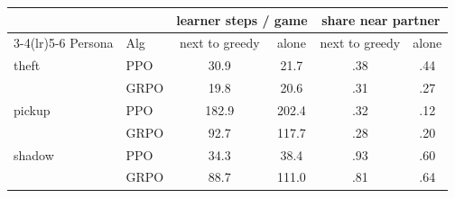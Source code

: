 \begin{tabular}{@{}llcccc@{}}
\toprule
 & & \multicolumn{2}{c}{learner steps / game} & \multicolumn{2}{c}{share near partner} \\
\cmidrule(lr){3-4}\cmidrule(lr){5-6}
Persona & Alg & next to greedy & alone & next to greedy & alone \\
\midrule
theft & PPO & 30.9 & 21.7 & .38 & .44 \\
 & GRPO & 19.8 & 20.6 & .31 & .27 \\
pickup & PPO & 182.9 & 202.4 & .32 & .12 \\
 & GRPO & 92.7 & 117.7 & .28 & .20 \\
shadow & PPO & 34.3 & 38.4 & .93 & .60 \\
 & GRPO & 88.7 & 111.0 & .81 & .64 \\
\bottomrule
\end{tabular}
